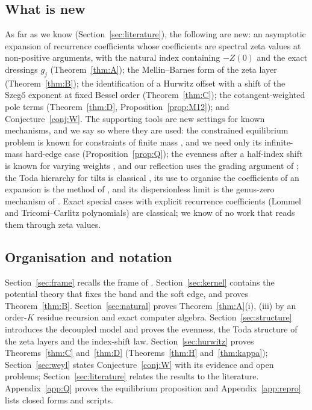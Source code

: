 \subsection{What is new}\label{sec:new}
As far as we know (Section~\ref{sec:literature}), the following are new: an asymptotic expansion of recurrence coefficients whose
coefficients are spectral zeta values at non-positive arguments, with the natural index containing $-Z(0)$ and the exact dressings $g_j$
(Theorem~\ref{thm:A}); the Mellin--Barnes form of the zeta layer (Theorem~\ref{thm:B}); the identification of a Hurwitz offset with a shift
of the Szeg\H{o} exponent at fixed Bessel order (Theorem~\ref{thm:C}); the cotangent-weighted pole terms (Theorem~\ref{thm:D},
Proposition~\ref{prop:M12}); and Conjecture~\ref{conj:W}. The supporting tools are new settings for known mechanisms, and we say so where
they are used: the constrained equilibrium problem is known for constraints of finite mass \cite{BeckermannKuijlaars2001,BeckermannHelart},
and we need only its infinite-mass hard-edge case (Proposition~\ref{prop:Q}); the evenness after a half-index shift is known for varying
weights \cite{BleherIts,KuijlaarsTibboel}, and our reflection uses the grading argument of \cite{KuijlaarsTibboel}; the Toda hierarchy for
tilts is classical \cite{VanAsscheToda}, its use to organise the coefficients of an expansion is the method of \cite{EMP}, and its
dispersionless limit is the genus-zero mechanism of \cite{Ercolani}. Exact special cases with explicit recurrence coefficients (Lommel and
Tricomi--Carlitz polynomials) are classical; we know of no work that reads them through zeta values.

\subsection{Organisation and notation}\label{sec:organisation}
Section~\ref{sec:frame} recalls the frame of \cite{PaperII}. Section~\ref{sec:kernel} contains the potential theory that fixes the band and
the soft edge, and proves Theorem~\ref{thm:B}. Section~\ref{sec:natural} proves Theorem~\ref{thm:A}(i), (iii) by an order-$K$ residue
recursion and exact computer algebra. Section~\ref{sec:structure} introduces the decoupled model and proves the evenness, the Toda structure of
the zeta layers and the index-shift law. Section~\ref{sec:hurwitz} proves Theorems~\ref{thm:C} and~\ref{thm:D} (Theorems~\ref{thm:H} and~\ref{thm:kappa}); Section~\ref{sec:weyl} states
Conjecture~\ref{conj:W} with its evidence and open problems; Section~\ref{sec:literature} relates the results to the literature.
Appendix~\ref{app:Q} proves the equilibrium proposition and Appendix~\ref{app:repro} lists closed forms and scripts.

